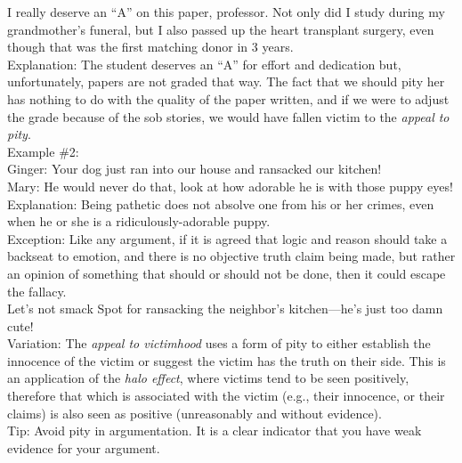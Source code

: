 \documentclass[a4paper,12pt,single,pdftex]{scrartcl}
\begin{document}
    
      I really deserve an “A” on this paper, professor.  Not only did I study during my grandmother’s funeral, but I also passed up the heart transplant surgery, even though that was the first matching donor in 3 years.
    \\

    
      Explanation: The student deserves an “A” for effort and dedication but, unfortunately, papers are not graded that way.  The fact that we should pity her has nothing to do with the quality of the paper written, and if we were to adjust the grade because of the sob stories, we would have fallen victim to the {\it appeal to pity}.
    \\

    
      Example \#2:
    \\

    
      Ginger: Your dog just ran into our house and ransacked our kitchen!
    \\

    
      Mary: He would never do that, look at how adorable he is with those puppy eyes!
    \\

    
      Explanation: Being pathetic does not absolve one from his or her crimes, even when he or she is a ridiculously-adorable puppy.
    \\

    
      Exception: Like any argument, if it is agreed that logic and reason should take a backseat to emotion, and there is no objective truth claim being made, but rather an opinion of something that should or should not be done, then it could escape the fallacy.
    \\

    
      Let's not smack Spot for ransacking the neighbor's kitchen—he's just too damn cute!
    \\

    
      Variation: The {\em appeal to victimhood} uses a form of pity to either establish the innocence of the victim or suggest the victim has the truth on their side. This is an application of the {\em halo effect}, where victims tend to be seen positively, therefore that which is associated with the victim (e.g., their innocence, or their claims) is also seen as positive (unreasonably and without evidence).
    \\

    
      Tip: Avoid pity in argumentation.  It is a clear indicator that you have weak evidence for your argument.
    \\
\end{document}
